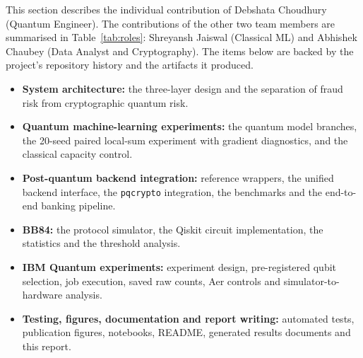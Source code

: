 This section describes the individual contribution of Debshata Choudhury (Quantum Engineer). The contributions of the other two team members are summarised in Table~\ref{tab:roles}: Shreyansh Jaiswal (Classical ML) and Abhishek Chaubey (Data Analyst and Cryptography). The items below are backed by the project's repository history and the artifacts it produced.

\begin{itemize}[noitemsep]
\item \textbf{System architecture:} the three-layer design and the separation of fraud risk from cryptographic quantum risk.
\item \textbf{Quantum machine-learning experiments:} the quantum model branches, the 20-seed paired local-sum experiment with gradient diagnostics, and the classical capacity control.
\item \textbf{Post-quantum backend integration:} reference wrappers, the unified backend interface, the \texttt{pqcrypto} integration, the benchmarks and the end-to-end banking pipeline.
\item \textbf{BB84:} the protocol simulator, the Qiskit circuit implementation, the statistics and the threshold analysis.
\item \textbf{IBM Quantum experiments:} experiment design, pre-registered qubit selection, job execution, saved raw counts, Aer controls and simulator-to-hardware analysis.
\item \textbf{Testing, figures, documentation and report writing:} \TestsTotal{} automated tests, publication figures, notebooks, README, generated results documents and this report.
\end{itemize}
